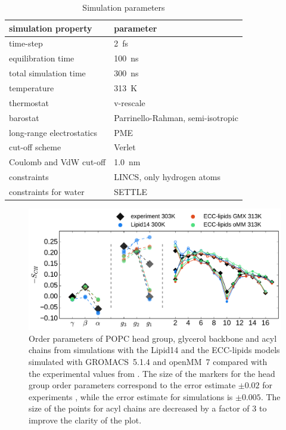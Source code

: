 \documentclass[aip,jcp,twocolumn]{revtex4}
\begin{document}
\begin{table}[btp!]
  \caption{Simulation parameters}
  \label{tbl:mdpar}
  \begin{tabular}{ll}
    simulation property & parameter   \\
    \hline
    time-step           & 2~fs         \\
    equilibration time  & 100~ns  \\
    total simulation time     & 300~ns  \\
    temperature         & 313~K       \\
    thermostat          & v-rescale  \cite{bussi07}   \\
    barostat            & Parrinello-Rahman, semi-isotropic \cite{parrinello81} \\
    long-range electrostatics & PME  \cite{darden93}  \\
    cut-off scheme      & Verlet \cite{Pall13}      \\
    Coulomb and VdW cut-off & 1.0~nm \\
    constraints         & LINCS, only hydrogen atoms \cite{hess97} \\
    constraints for water & SETTLE  \cite{miyamoto92} \\
    \hline
  \end{tabular}
\end{table}

\begin{figure}[tbp!]
  \centering
  \includegraphics[width=16.0cm]{../Fig/ipython_nb/Order-parameters_exp-L14-ECCL17_q80_sig89_GMX-oMM_compar.pdf}
  \caption{\label{fig:ordPars_actual_GMX_oMM_compar}
    Order parameters of POPC head group, glycerol backbone and acyl chains 
    from simulations with the Lipid14 \cite{dickson14} and the ECC-lipids models
    simulated with GROMACS~5.1.4 \cite{Abraham15} and openMM~7 \cite{openmm7} 
    compared with the experimental values from \cite{ferreira13}.
    The size of the markers for the head group order parameters correspond to
    the error estimate $\pm 0.02$ for experiments \cite{botan15,ollila16},
    while the error estimate for simulations is $\pm 0.005$.
    The size of the points for acyl chains are decreased by a factor of 3 to improve the clarity of the plot.
  }
\end{figure}
\end{document}
